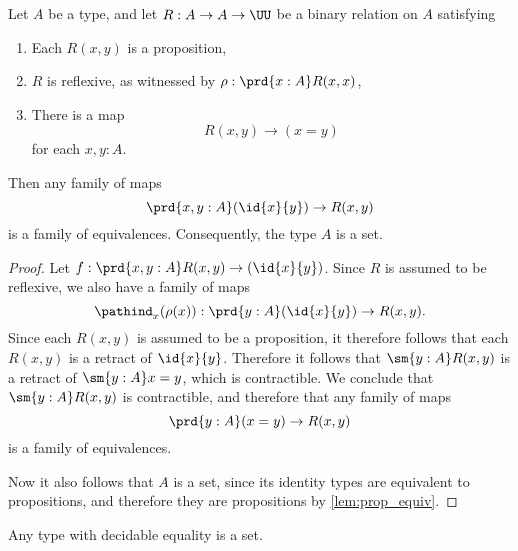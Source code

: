 \begin{thm}\label{lem:prop_to_id}
Let $A$ be a type, and let $R:A\to A\to\UU$ be a binary relation on $A$ satisfying
\begin{enumerate}
\item Each $R(x,y)$ is a proposition,
\item $R$ is reflexive, as witnessed by $\rho:\prd{x:A}R(x,x)$,
\item There is a map
  \begin{equation*}
    R(x,y)\to (x=y)
  \end{equation*}
  for each $x,y:A$.
\end{enumerate}
Then any family of maps
\begin{equation*}
\prd{x,y:A}(\id{x}{y})\to R(x,y)
\end{equation*}
is a family of equivalences. Consequently, the type $A$ is a set.
\end{thm}

\begin{proof}
Let $f:\prd{x,y:A}R(x,y)\to(\id{x}{y})$. 
Since $R$ is assumed to be reflexive, we also have a family of maps
\begin{equation*}
\pathind_x(\rho(x)):\prd{y:A}(\id{x}{y})\to R(x,y).
\end{equation*}
Since each $R(x,y)$ is assumed to be a proposition, it therefore follows that each $R(x,y)$ is a retract of $\id{x}{y}$. Therefore it follows that $\sm{y:A}R(x,y)$ is a retract of $\sm{y:A}x=y$, which is contractible. We conclude that $\sm{y:A}R(x,y)$ is contractible, and therefore that any family of maps
\begin{equation*}
  \prd{y:A}(x=y)\to R(x,y)
\end{equation*}
is a family of equivalences.

Now it also follows that $A$ is a set, since its identity types are equivalent to propositions, and therefore they are propositions by \cref{lem:prop_equiv}. 
\end{proof}

\begin{thm}[Hedberg]\label{thm:hedberg}
Any type with decidable equality is a set.
\end{thm}

